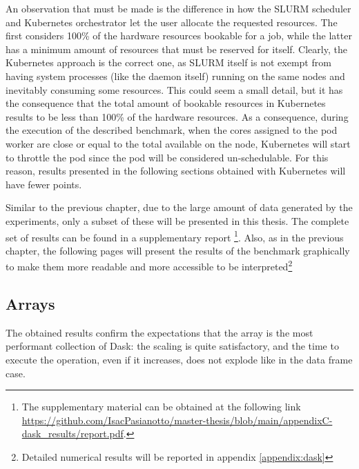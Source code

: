 
An observation that must be made is the difference in how the SLURM scheduler
and Kubernetes orchestrator let the user allocate the requested resources. The
first considers 100\% of the hardware resources bookable for a job, while the
latter has a minimum amount of resources that must be reserved for itself.
Clearly, the Kubernetes approach is the correct one, as SLURM itself is not
exempt from having system processes (like the daemon itself) running on the same
nodes and inevitably consuming some resources. This could seem a small detail,
but it has the consequence that the total amount of bookable resources in
Kubernetes results to be less than 100\% of the hardware resources. As a
consequence, during the execution of the described benchmark, when the cores
assigned to the pod worker are close or equal to the total available on the
node, Kubernetes will start to throttle the pod since the pod will be considered
un-schedulable. For this reason, results presented in the following sections
obtained with Kubernetes will have fewer points.

Similar to the previous chapter, due to the large amount of data generated by
the experiments, only a subset of these will be presented in this thesis. The
complete set of results can be found in a supplementary report \footnote {The
supplementary material can be obtained at the following link
\url{https://github.com/IsacPasianotto/master-thesis/blob/main/appendixC-dask_results/report.pdf}.}.
Also, as in the previous chapter, the following pages will present the results
of the benchmark graphically to make them more readable and more accessible to
be interpreted\footnote{Detailed numerical results will be reported in appendix
\ref{appendix:dask}}


\subsection{Arrays}

The obtained results confirm the expectations that the array is the most
performant collection of Dask: the scaling is quite satisfactory, and the time
to execute the operation, even if it increases, does not explode like in the
data frame case.

